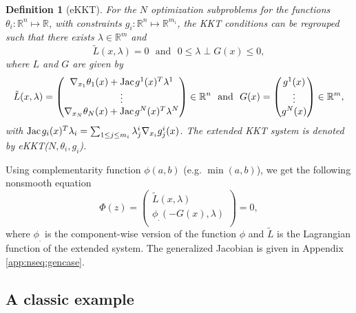 \documentclass[11pt, a4paper]{article}
\newcommand{\txtm}[1]{\textrm{~~#1~~}}
\newcommand{\Jac}{\textrm{Jac\hskip+.1em}}
\newcommand{\R}{\ensuremath{\mathbb{R}}}
\newtheorem{mydef}{Definition}
\begin{document}
\begin{mydef}[eKKT]
For the $N$ optimization subproblems for the functions $\theta_i: \R^{n} \mapsto \R$, with constraints $g_i: \R^{n} \mapsto \R^{m_i}$, the KKT conditions can be regrouped such that
there exists $\lambda \in \R^m$ and 
$$
\tilde L(x, \lambda) = 0 \txtm{and} 0 \leq \lambda \perp  G(x) \leq  0,
$$
where $L$ and $G$ are given by
$$
\tilde L(x, \lambda) = 
\left( 
\begin{matrix}
\nabla_{x_1} \theta_1(x) + \Jac g^{1}(x)^T \lambda^1 \\
\vdots \\
\nabla_{x_N} \theta_ N(x) + \Jac g^{N}(x)^T \lambda^N \\
\end{matrix}
\right)  
\in \R^{n}
\txtm{and}
G(x) = 
\left( 
\begin{matrix}
g^1(x) \\
\vdots \\
g^N(x) \\
\end{matrix}
\right) 
\in \R^{m},
$$
with $\Jac g_{i}(x)^T \lambda_i = \sum_{ 1 \leq j \leq m_i } \lambda_{j}^i \nabla_{x_i} g_{j}^i(x)  $. The extended KKT system is denoted by eKKT($N, \theta_i, g_i$).
\end{mydef}

Using complementarity function $\phi(a,b)$ (e.g. $\min(a,b)$), we get the following nonsmooth equation
$$
\Phi(z) = 
\left( 
\begin{matrix}
\tilde L(x, \lambda) \\
\phi_.(-G(x), \lambda) \\
\end{matrix}
\right) = 0 ,
$$
where $\phi_.$ is the component-wise version of the function $\phi$ and $\tilde L$ is the Lagrangian function of the extended system.
The generalized Jacobian is given in Appendix \ref{app:nseq:gencase}.

\subsection{A classic example}
\end{document}
